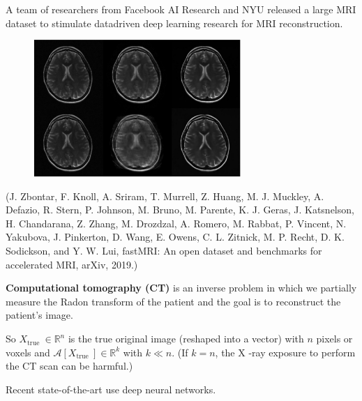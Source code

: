 \documentclass{report}
\begin{document}
\begin{definition}
    A team of researchers from Facebook AI Research and NYU released a large MRI dataset to stimulate datadriven deep learning research for MRI reconstruction.

    \begin{figure}[H]
        \centering
        \includegraphics[width=0.7\textwidth]{.././assets/8.26.jpg}
    \end{figure}

    (J. Zbontar, F. Knoll, A. Sriram, T. Murrell, Z. Huang, M. J. Muckley, A. Defazio, R. Stern, P. Johnson, M. Bruno, M. Parente, K. J. Geras, J. Katsnelson, H. Chandarana, Z. Zhang, M. Drozdzal, A. Romero, M. Rabbat, P. Vincent, N. Yakubova, J. Pinkerton, D. Wang, E. Owens, C. L. Zitnick, M. P. Recht, D. K. Sodickson, and Y. W. Lui, fastMRI: An open dataset and benchmarks for accelerated MRI, arXiv, 2019.)
\end{definition}

\begin{definition}
    \textbf{Computational tomography (CT)} is an inverse problem in which we partially measure the Radon transform of the patient and the goal is to reconstruct the patient's image.

    So $X_{\text {true }} \in \mathbb{R}^{n}$ is the true original image (reshaped into a vector) with $n$ pixels or voxels and $\mathcal{A}\left[X_{\text {true }}\right] \in \mathbb{R}^{k}$ with $k \ll n$. (If $k=n$, the X -ray exposure to perform the CT scan can be harmful.)

    Recent state-of-the-art use deep neural networks.
\end{definition}
\end{document}
